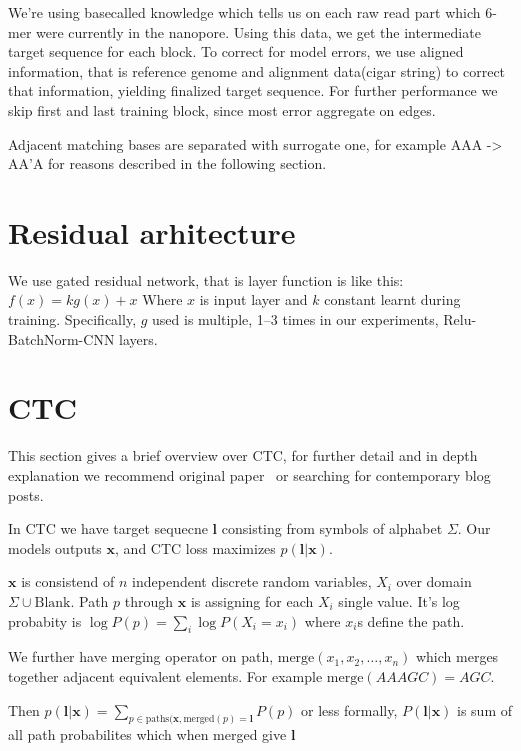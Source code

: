 \documentclass[times, utf8, seminar, numeric]{fer}
\begin{document}
We're using basecalled knowledge which tells us on each raw read part which 6-mer were currently in the nanopore. Using this data, we get the intermediate target sequence for each block. To correct for model errors, we use aligned information, that is reference genome and alignment data(cigar string) to correct that information, yielding finalized target sequence. For further performance we skip first and last training block, since most error aggregate on edges.

Adjacent matching bases are separated with surrogate one, for example AAA -> AA'A for reasons described in the following section.
\section{Residual arhitecture}

We use gated residual network, that is layer function is like this: $f(x) = k g(x) + x$ Where $x$ is input layer and $k$ constant learnt during training. Specifically, $g$ used is multiple, 1--3 times in our experiments, Relu-BatchNorm-CNN layers.

\section{CTC}

This section gives a brief overview over CTC, for further detail and in depth explanation we recommend original paper~\cite{graves2006connectionist} or searching for contemporary blog posts.

In CTC we have target sequecne $\mathbf{l}$ consisting from symbols of alphabet $\Sigma$. Our models outputs $\mathbf{x}$, and CTC loss maximizes $p(\mathbf{l}|\mathbf{x})$.

$\mathbf{x}$ is consistend of $n$ independent discrete random variables, $X_i$  over domain $\Sigma \cup \text{Blank}$. Path $p$ through $\mathbf{x}$ is assigning for each $X_i$ single value. It's log probabity is $\log P(p) = \sum_i {\log P(X_i=x_i)}$ where $x_i$s define the path.

We further have merging operator on path, $\text{merge}(x_1, x_2, \ldots, x_n)$ which merges together adjacent equivalent elements. For example $\text{merge}(AAAGC) = AGC$.

Then $p(\mathbf{l}|\mathbf{x}) = \sum_{p\in\text{paths}(\mathbf{x}, \text{merged}(p) = \mathbf{l}}{P(p)}$ or less formally, $P(\mathbf{l}|\mathbf{x})$ is sum of all path probabilites which when merged give $\mathbf{l}$
\end{document}
